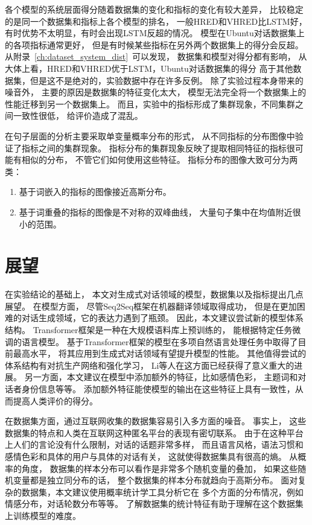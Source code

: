 各个模型的系统层面得分随着数据集的变化和指标的变化有较大差异，
比较稳定的是同一个数据集和指标上各个模型的排名，
一般HRED和VHRED比LSTM好，
有时优势不太明显，有时会出现LSTM反超的情况。
模型在Ubuntu对话数据集上的各项指标通常更好，
但是有时候某些指标在另外两个数据集上的得分会反超。
从附录~\ref{ch:dataset_system_dist}~可以发现，
数据集和模型对得分都有影响，
从大体上看，HRED和VHRED优于LSTM，Ubuntu对话数据集的得分
高于其他数据集，但是这不是绝对的，实验数据中存在许多反例。
除了实验过程本身带来的噪音外，
主要的原因是数据集的特征变化太大，
模型无法完全将一个数据集上的性能迁移到另一个数据集上。
而且，实验中的指标形成了集群现象，不同集群之间一致性很低，
给评价造成了混乱。

在句子层面的分析主要采取单变量概率分布的形式，
从不同指标的分布图像中验证了指标之间的集群现象。
指标分布的集群现象反映了提取相同特征的指标很可能有相似的分布，
不管它们如何使用这些特征。
指标分布的图像大致可分为两类：
\begin{enumerate}
    \item 基于词嵌入的指标的图像接近高斯分布。
    \item 基于词重叠的指标的图像是不对称的双峰曲线， 大量句子集中在均值附近很小的范围。
\end{enumerate}

\section*{展望}\label{sec:future_work}
在实验结论的基础上，
本文对生成式对话领域的模型，数据集以及指标提出几点展望。
在模型方面， 尽管Seq2Seq框架在机器翻译领域取得成功，
但是在更加困难的对话生成领域，它的表达力遇到了瓶颈。
因此，本文建议尝试新的模型体系结构。
Transformer框架是一种在大规模语料库上预训练的，
能根据特定任务微调的语言模型。
基于Transformer框架的模型在多项自然语言处理任务中取得了目前最高水平，
将其应用到生成式对话领域有望提升模型的性能。
其他值得尝试的体系结构有对抗生产网络和强化学习，
Li等人在这方面已经获得了意义重大的进展。
另一方面，本文建议在模型中添加额外的特征，比如感情色彩，
主题词和对话者身份信息等等。
添加额外特征能使模型的输出在这些特征上具有一致性，从而提高人类评价的得分。

在数据集方面，通过互联网收集的数据集容易引入多方面的噪音。
事实上，
这些数据集的特点和人类在互联网这种匿名平台的表现有密切联系。
由于在这种平台上人们的言论没有什么限制，对话的话题非常多样，
而且语言风格，语法习惯和感情色彩和具体的用户与具体的对话有关，
这就使得数据集具有很高的熵。
从概率的角度，
数据集的样本分布可以看作是非常多个随机变量的叠加，
如果这些随机变量都是独立同分布的话，
整个数据集的样本分布就趋向于高斯分布。
面对复杂的数据集，本文建议使用概率统计学工具分析它在
多个方面的分布情况，例如情感分布，对话轮数分布等等。
了解数据集的统计特征有助于理解在这个数据集上训练模型的难度。

